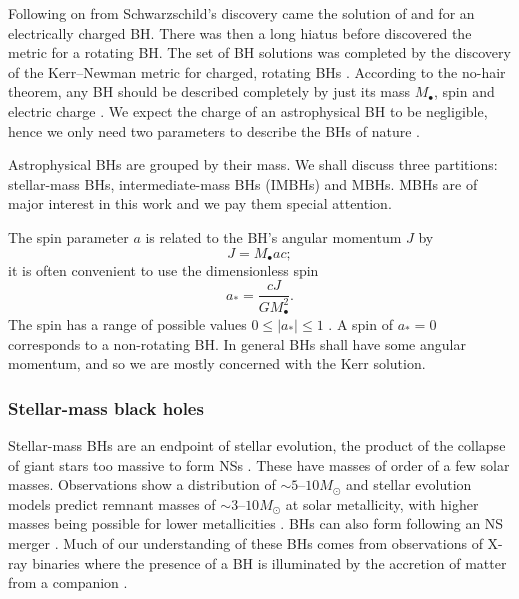 Following on from Schwarzschild's discovery came the solution of \citet{Reissner1916} and \citet{Nordstrom1918} for an electrically charged BH. There was then a long hiatus before \citet{Kerr1963} discovered the metric for a rotating BH. The set of BH solutions was completed by the discovery of the Kerr--Newman metric for charged, rotating BHs \citep{Newman1965}. According to the no-hair theorem, any BH should be described completely by just its mass $M_\bullet$, spin and electric charge \citep{Israel1967, Israel1968, Carter1971, Hawking1972, Robinson1975}. We expect the charge of an astrophysical BH to be negligible, hence we only need two parameters to describe the BHs of nature \citep[sections 36, 51]{Chandrasekhar1992}.

Astrophysical BHs are grouped by their mass. We shall discuss three partitions: stellar-mass BHs, intermediate-mass BHs (IMBHs) and MBHs. MBHs are of major interest in this work and we pay them special attention.

The spin parameter $a$ is related to the BH's angular momentum $J$ by
\begin{equation}
J = M_\bullet ac;
\end{equation}
it is often convenient to use the dimensionless spin
\begin{equation}
a_\ast = \dfrac{cJ}{GM_\bullet^2}.
\end{equation}
The spin has a range of possible values $0 \leq |a_\ast| \leq 1$ \cite[section 66]{Chandrasekhar1992}. A spin of $a_\ast = 0$ corresponds to a non-rotating BH. In general BHs shall have some angular momentum, and so we are mostly concerned with the Kerr solution.

\subsubsection{Stellar-mass black holes}

Stellar-mass BHs are an endpoint of stellar evolution, the product of the collapse of giant stars too massive to form NSs \citep{Postnov2006}. These have masses of order of a few solar masses. Observations show a distribution of $\sim5$--$10M_\odot$ \citep{Ozel2010,Farr2010} and stellar evolution models predict remnant masses of $\sim3$--$10M_\odot$ at solar metallicity, with higher masses being possible for lower metallicities \citep{Woosley2002}. BHs can also form following an NS merger \citep{Rezzolla2011,Faber2012}. Much of our understanding of these BHs comes from observations of X-ray binaries where the presence of a BH is illuminated by the accretion of matter from a companion \citep{Shakura1973,Remillard2006}.

